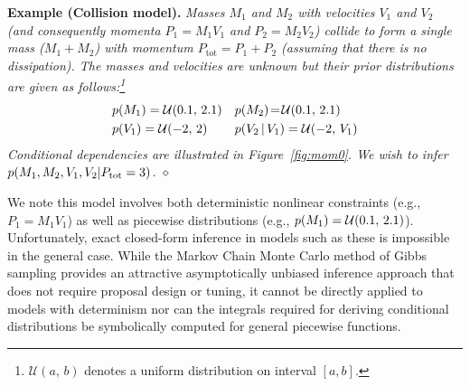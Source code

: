 {\bf Example (Collision model). }
\emph{Masses $M_1$ and $M_2$ with velocities $V_1$ and $V_2$ (and consequently momenta $P_1 = M_1 V_1$ and $P_2 = M_2 V_2$) collide to form a single mass ($M_1 + M_2$) with momentum $P_\text{tot} = P_1 + P_2$ (assuming that there is no dissipation).
The masses and velocities are unknown but 
their prior distributions are given as follows:\footnote{
$\mathcal{U}(a, \, b)$ denotes a uniform distribution on interval $[a,b]$.
} 
}%
{\footnotesize %
\begin{align}
&p(M_1) = \mathcal{U}(0.1, \, 2.1) 
&&p(M_2) \!=\! \mathcal{U}(0.1, \, 2.1)
\nonumber
\\
&p(V_1) = \mathcal{U}(-2, \, 2)
&&p(V_2 \, | \, V_1) = \mathcal{U}(-2, \, V_1)
\label{e:collision}
\end{align} 
}
\emph{
\!\!\!Conditional dependencies are illustrated in Figure~\ref{fig:mom0}. %
We wish to infer $p(M_1, M_2, V_1, V_2 | P_{\text{tot}} = 3)$.
\hspace*{\fill} $\diamond$} %

We note this model involves both deterministic nonlinear constraints
(e.g., $P_1 = M_1 V_1$) as well as piecewise distributions (e.g.,
$p(M_1) = \mathcal{U}(0.1, \, 2.1)$).  Unfortunately, exact
closed-form inference in models such as these is impossible in the
general case.  While the Markov Chain Monte Carlo method of Gibbs
sampling provides an attractive asymptotically unbiased inference
approach that does not require proposal design or tuning, it cannot be
directly applied to models with determinism nor can the integrals
required for deriving conditional distributions be symbolically
computed for general piecewise functions.

